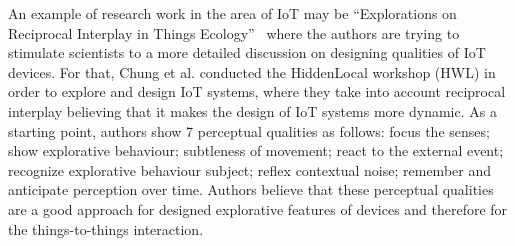\par An example of research work in the area of IoT may be “Explorations on Reciprocal Interplay in Things Ecology”~\cite{chung2018explorations} where the authors are trying to stimulate scientists to a more detailed discussion on designing qualities of IoT devices. For that, Chung et al. conducted the HiddenLocal workshop (HWL) in order to explore and design IoT systems, where they take into account reciprocal interplay believing that it makes the design of IoT systems more dynamic. As a starting point, authors show 7 perceptual qualities as follows: focus the senses; show explorative behaviour; subtleness of movement; react to the external event; recognize explorative behaviour subject; reflex contextual noise; remember and anticipate perception over time. Authors believe that these perceptual qualities are a good approach for designed explorative features of devices and therefore for the things-to-things interaction.  

